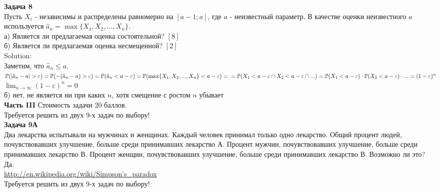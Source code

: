 \documentclass[12pt, a4paper]{article}\usepackage[]{graphicx}\usepackage[]{color}
\begin{document}
\textbf{Задача 8} \\ %
Пусть $X_{i}$ - независимы и распределены равномерно на $[a-1;a]$, где $a$ - неизвестный параметр. В качестве оценки неизвестного $a$ используется $\hat{a}_{n}=\max\{X_{1},X_{2},...,X_{n}\}$. \\
а) Является ли предлагаемая оценка состоятельной? $[8]$ \\
б) Является ли предлагаемая оценка несмещенной? $[2]$ \\
Solution: \\
Заметим, что $\hat{a}_{n}\leq a$. \\
$\P(|\hat{a}_{n}-a|>\varepsilon)=\P(-(\hat{a}_{n}-a)>\varepsilon)=\P(\hat{a}_{n}<a-\varepsilon)=\P(\max\{X_{1},X_{2},...,X_{n}\}<a-\varepsilon)= \\
=\P(X_{1}<a-\varepsilon \cap X_{2}< a-\varepsilon\cap ...)=
\P(X_{1}<a-\varepsilon)\cdot \P(X_{2}<a-\varepsilon)\cdot ...=(1-\varepsilon)^{n}$ \\
$\lim_{n\to\infty} (1-\varepsilon)^{n} =0$ \\
б) нет, не является ни при каких $n$, хотя смещение с ростом $n$ убывает \\


\textbf{Часть III} Стоимость задачи 20 баллов. \\

Требуется решить \textbf{} из двух 9-х задач по
выбору! \\


\textbf{Задача 9А} \\
Два лекарства испытывали на мужчинах и женщинах. Каждый
человек принимал только одно лекарство. Общий процент людей,
почувствовавших улучшение, больше среди принимавших лекарство А.
Процент мужчин, почувствовавших улучшение, больше среди принимавших лекарство В. Процент женщин, почувствовавших улучшение, больше среди принимавших лекарство В. Возможно ли это? \\
Да. \\
\url{http://en.wikipedia.org/wiki/Simpson's_paradox} \\

Требуется решить \textbf{} из двух 9-х задач по
выбору! \\
\end{document}
